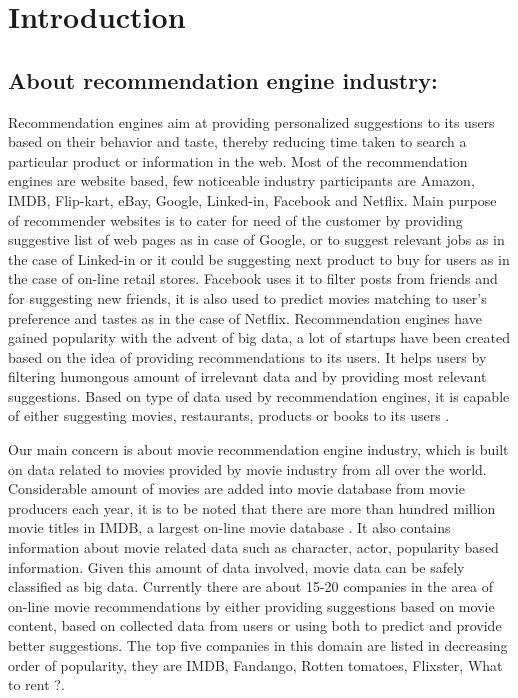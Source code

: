 
\chapter{Introduction} %

\label{Chapter1} %


\section{About recommendation engine industry:}
 
 Recommendation engines aim at providing personalized suggestions to its users based on their behavior and taste, thereby reducing time taken to search a particular product or information in the web. Most of the recommendation engines are website based, few noticeable industry participants are Amazon, \acrshort{IMDB}, Flip-kart, eBay, Google, Linked-in, Facebook and Netflix. Main purpose of recommender websites is to cater for need of the customer by providing suggestive list of web pages as in case of Google, or to suggest relevant jobs as in the case of Linked-in or it could be suggesting next product to buy for users as in the case of on-line retail stores. Facebook uses it to filter posts from friends and for suggesting new friends, it is also used to predict movies matching to user's preference and tastes as in the case of Netflix. Recommendation engines have gained popularity with the advent of big data, a lot of startups have been created based on the idea of providing recommendations to its users. It helps users by filtering humongous amount of irrelevant data and by providing most relevant suggestions. Based on type of data used by recommendation engines, it is capable of either suggesting movies, restaurants, products or books to its users \citep{Recom0}. 

 Our main concern is about movie recommendation engine industry, which is built on data related to movies provided by movie industry from all over the world. Considerable amount of movies are added into movie database from movie producers each year, it is to be noted that there are more than hundred million movie titles in \acrshort{IMDB}, a largest on-line movie database \citep{IMDb2}. It also contains information about movie related data such as character, actor, popularity based information. Given this amount of data involved, movie data can be safely classified as big data. Currently there are about 15-20 companies in the area of on-line movie recommendations by either providing suggestions based on movie content, based on collected data from users or using both to predict and provide better suggestions. The top five companies in this domain are listed in decreasing order of popularity, they are \acrshort{IMDB}, Fandango, Rotten tomatoes, Flixster, What to rent ?. 

